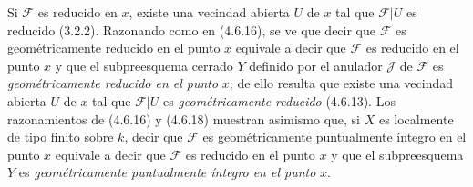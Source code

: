 
Si $\mathscr F$ es reducido en $x$, existe una vecindad abierta $U$ de $x$ tal
que $\mathscr F|U$ es reducido (3.2.2). Razonando como en (4.6.16), se ve que
decir que $\mathscr F$ es geométricamente reducido en el punto $x$ equivale a
decir que $\mathscr F$ es reducido en el punto $x$ y que el subpreesquema
cerrado $Y$ definido por el anulador $\mathscr J$ de $\mathscr F$ es
\emph{geométricamente reducido en el punto} $x$; de ello resulta que existe una vecindad
abierta $U$ de $x$ tal que $\mathscr F|U$ es \emph{geométricamente reducido} (4.6.13).
Los razonamientos de (4.6.16) y (4.6.18) muestran asimismo que, si $X$ es
localmente de tipo finito sobre $k$, decir que $\mathscr F$ es geométricamente
puntualmente íntegro en el punto $x$ equivale a decir que $\mathscr F$ es
reducido en el punto $x$ y que el subpreesquema $Y$ es \emph{geométricamente
puntualmente íntegro en el punto} $x$.

